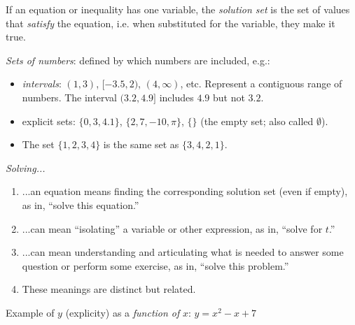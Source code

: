 \documentclass{amsbook}
\numberwithin{section}{chapter}
\numberwithin{equation}{chapter}
\begin{document}
If an equation or inequality has one variable, the \textit{solution set} is the set of values that \textit{satisfy} the equation, i.e. when substituted for the variable, they make it true.


\begin{comment}
\begin{itemize}
\item\ \ $2\cdot3+1 = 7$\ \ \ [true]
\item\ \ $2 < 7$\ \ \ [true]
\item\ \ $2\cdot3+1 = 6+8$\ \ \ [false]
\item\ \ $2\cdot3+1 \neq 6+8$\ \ \ [true]
\item\ \ $2x-5 = 13$\ \ [true if $x$ is 9 and false otherwise.]
\end{itemize}
\end{comment}



\textit{Sets  of numbers}: defined by which numbers are included, e.g.:

\begin{itemize}
	\item \textit{intervals}: $(1,3)$, $[-3.5, 2)$, $(4,\infty)$, etc. Represent a contiguous range of numbers. The interval $(3.2, 4.9]$ includes $4.9$ but not $3.2$.
	\item explicit sets: $\{0, 3, 4.1 \}$, $\{ 2, 7, -10, \pi \}$, $\{\}$ (the empty set; also called $\emptyset$).
	\item The set $\{ 1,2,3, 4 \}$ is the same set as $\{ 3,4,2,1 \}$.
\end{itemize}


\textit{Solving...}
\begin{enumerate}
	\item ...an equation means finding the corresponding solution set (even if empty), as in, ``solve this equation.''
	\item ...can mean ``isolating'' a variable or other expression, as in, ``solve for $t$.''
	\item ...can mean understanding and articulating what is needed to answer some question or perform some exercise, as in, ``solve this problem.''
	\item These meanings are distinct but related.
\end{enumerate}

Example of $y$ (explicity) as a \textit{function of} $x$: $y = x^2-x+7$
\end{document}
